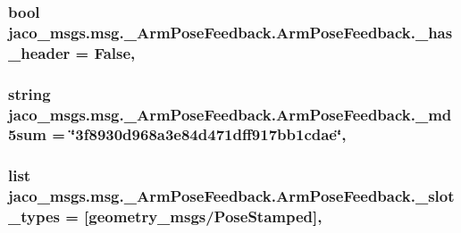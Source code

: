 \subsubsection[{\texorpdfstring{\+\_\+has\+\_\+header}{_has_header}}]{\setlength{\rightskip}{0pt plus 5cm}bool jaco\+\_\+msgs.\+msg.\+\_\+\+Arm\+Pose\+Feedback.\+Arm\+Pose\+Feedback.\+\_\+has\+\_\+header = False\hspace{0.3cm}{\ttfamily [static]}, {\ttfamily [private]}}\hypertarget{classjaco__msgs_1_1msg_1_1__ArmPoseFeedback_1_1ArmPoseFeedback_ad72f768e0f4361806fd3fe867d0e6372}{}\label{classjaco__msgs_1_1msg_1_1__ArmPoseFeedback_1_1ArmPoseFeedback_ad72f768e0f4361806fd3fe867d0e6372}
\subsubsection[{\texorpdfstring{\+\_\+md5sum}{_md5sum}}]{\setlength{\rightskip}{0pt plus 5cm}string jaco\+\_\+msgs.\+msg.\+\_\+\+Arm\+Pose\+Feedback.\+Arm\+Pose\+Feedback.\+\_\+md5sum = \char`\"{}3f8930d968a3e84d471dff917bb1cdae\char`\"{}\hspace{0.3cm}{\ttfamily [static]}, {\ttfamily [private]}}\hypertarget{classjaco__msgs_1_1msg_1_1__ArmPoseFeedback_1_1ArmPoseFeedback_a56831e0a4979e44deada98db3a578cc8}{}\label{classjaco__msgs_1_1msg_1_1__ArmPoseFeedback_1_1ArmPoseFeedback_a56831e0a4979e44deada98db3a578cc8}
\subsubsection[{\texorpdfstring{\+\_\+slot\+\_\+types}{_slot_types}}]{\setlength{\rightskip}{0pt plus 5cm}list jaco\+\_\+msgs.\+msg.\+\_\+\+Arm\+Pose\+Feedback.\+Arm\+Pose\+Feedback.\+\_\+slot\+\_\+types = \mbox{[}\textquotesingle{}geometry\+\_\+msgs/Pose\+Stamped\textquotesingle{}\mbox{]}\hspace{0.3cm}{\ttfamily [static]}, {\ttfamily [private]}}\hypertarget{classjaco__msgs_1_1msg_1_1__ArmPoseFeedback_1_1ArmPoseFeedback_a03c8dcb13de9e15ff8dab1ff25db7058}{}\label{classjaco__msgs_1_1msg_1_1__ArmPoseFeedback_1_1ArmPoseFeedback_a03c8dcb13de9e15ff8dab1ff25db7058}


